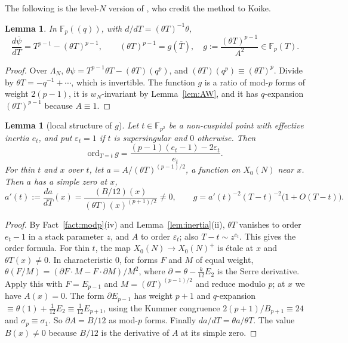 \documentclass[11pt,a4paper]{article}
\numberwithin{equation}{section}
\newtheorem{lemma}[theorem]{Lemma}
\theoremstyle{definition}
\theoremstyle{remark}
\newcommand{\Fp}{\mathbb F_p}
\newcommand{\Fq}{\mathbb F_{p^2}}
\begin{document}
The following is the level-$N$ version of \citet[\S10, (35)--(38)]{KZ98}, who credit the method to Koike.

\begin{lemma}\label{lem:dpsi}
In $\Fp((q))$, with $d/dT=(\theta T)^{-1}\theta$,
\[
\frac{d\overline\psi}{dT}=T^{p-1}-(\theta T)^{p-1},\qquad (\theta T)^{p-1}=g(\overline T),\quad
g:=\frac{(\theta T)^{p-1}}{A^2}\in\Fp(T).
\]
\end{lemma}
\begin{proof}
Over $\Lambda_N$, $\theta\psi=T^{p-1}\theta T-(\theta T)(q^p)$, and $(\theta T)(q^p)\equiv(\theta T)^p$.
Divide by $\theta T=-q^{-1}+\cdots$, which is invertible. The function $g$ is a ratio of mod-$p$
forms of weight $2(p-1)$, it is $w_N$-invariant by Lemma~\ref{lem:AW}, and it has $q$-expansion
$(\theta T)^{p-1}$ because $A\equiv1$.
\end{proof}

\begin{lemma}[local structure of $g$]\label{lem:g}
Let $t\in\Fq$ be a non-cuspidal point with effective inertia $e_t$, and put $\varepsilon_t=1$ if
$t$ is supersingular and $0$ otherwise. Then
\[
\mathrm{ord}_{T=t}\,g=\frac{(p-1)(e_t-1)-2\varepsilon_t}{e_t}.
\]
For thin $t$ and $x$ over $t$, let $a=A/(\theta T)^{(p-1)/2}$, a function on $X_0(N)$ near $x$.
Then $a$ has a simple zero at $x$,
\[
a'(t):=\frac{da}{dT}(x)=\frac{(B/12)(x)}{(\theta T)(x)^{(p+1)/2}}\ne0,
\qquad g=a'(t)^{-2}(T-t)^{-2}\bigl(1+O(T-t)\bigr).
\]
\end{lemma}
\begin{proof}
By Fact~\ref{fact:modp}(iv) and Lemma~\ref{lem:inertia}(ii), $\theta T$ vanishes to order $e_t-1$ in a
stack parameter $z$, and $A$ to order $\varepsilon_t$; also $T-t\sim z^{e_t}$. This gives the order formula.
For thin $t$, the map $X_0(N)\to X_0(N)^+$ is \'etale at $x$ and $\theta T(x)\ne0$. In
characteristic $0$, for forms $F$ and $M$ of equal weight,
$\theta(F/M)=(\partial F\cdot M-F\cdot\partial M)/M^2$, where $\partial=\theta-\frac{k}{12}E_2$ is the
Serre derivative. Apply this with $F=E_{p-1}$ and $M=(\theta T)^{(p-1)/2}$ and reduce modulo $p$; at
$x$ we have $A(x)=0$. The form $\partial E_{p-1}$ has weight $p+1$ and $q$-expansion
$\equiv\theta(1)+\frac1{12}E_2\equiv\frac1{12}E_{p+1}$, using the Kummer congruence
$2(p+1)/B_{p+1}\equiv24$ and $\sigma_p\equiv\sigma_1$. So $\partial A=B/12$ as mod-$p$ forms. Finally
$da/dT=\theta a/\theta T$. The value $B(x)\ne0$ because $B/12$ is the derivative of $A$ at its simple zero.
\end{proof}
\end{document}
